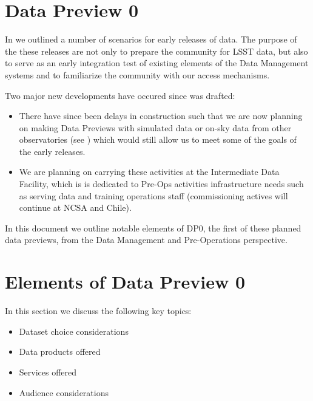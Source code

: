 \section{Data Preview 0}\label{sec:dp0}

In  we outlined a number of scenarios for early releases of \RO data.
The purpose of the these releases are not only to prepare the community for LSST data, but also to serve as an early integration test of existing elements of the Data Management systems and to familiarize the community with our access mechanisms.  

Two major new developments have occured since  was drafted:

\begin{itemize}
  
\item There have since been delays in construction such that we are now planning on making Data Previews with \RO simulated data or on-sky data from other observatories (see ) which would still allow us to meet some of the goals of the early releases. 

\item We are planning on carrying these activities at the Intermediate Data Facility, which is is dedicated to Pre-Ops activities infrastructure needs such as serving data and training operations staff (commissioning actives will continue at NCSA and Chile).

\end{itemize}

In this document we outline notable elements of DP0, the first of these planned data previews, from the Data Management and Pre-Operations perspective.

\section{Elements of Data Preview 0}

In this section we discuss the following key topics:

\begin{itemize}

\item Dataset choice considerations

\item Data products offered

\item Services offered

\item Audience considerations

\end{itemize}

